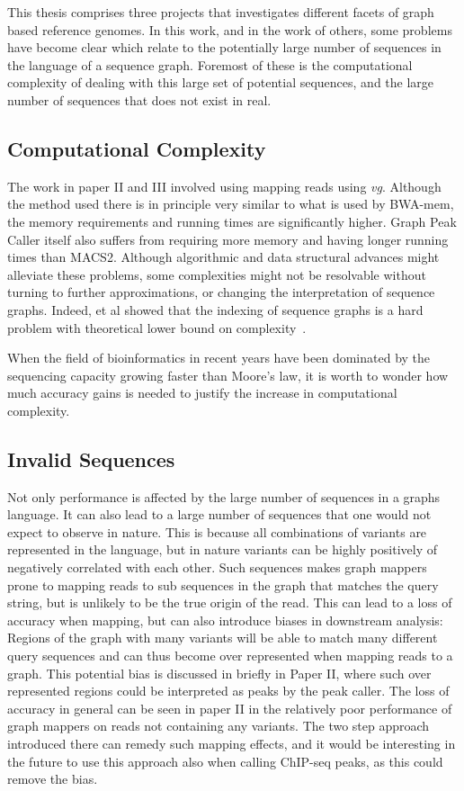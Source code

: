 This thesis comprises three projects that investigates different facets of graph based reference genomes.
In this work, and in the work of others, some problems have become clear which relate to the potentially large number of sequences in the language of a sequence graph. Foremost of these is the computational complexity of dealing with this large set of potential sequences, and the large number of sequences that does not exist in real.

\subsection{Computational Complexity}
The work in paper II and III involved using mapping reads using \emph{vg}.
Although the method used there is in principle very similar to what is used by BWA-mem, the memory requirements and running times are significantly higher.
Graph Peak Caller itself also suffers from requiring more memory and having longer running times than MACS2. 
Although algorithmic and data structural advances might alleviate these problems, some complexities might not be resolvable without turning to further approximations, or changing the interpretation of sequence graphs. Indeed,  et al showed that the indexing of sequence graphs is a hard problem with theoretical lower bound on complexity~\cite{indexcomplexity}.

When the field of bioinformatics in recent years have been dominated by the sequencing capacity growing faster than Moore's law, it is worth to wonder how much accuracy gains is needed to justify the increase in computational complexity.

\subsection{Invalid Sequences}
Not only performance is affected by the large number of sequences in a graphs language.
It can also lead to a large number of sequences that one would not expect to observe in nature.
This is because all combinations of variants are represented in the language, but in nature variants can be highly positively of negatively correlated with each other.
Such sequences makes graph mappers prone to mapping reads to sub sequences in the graph that matches the query string, but is unlikely to be the true origin of the read.
This can lead to a loss of accuracy when mapping, but can also introduce biases in downstream analysis: Regions of the graph with many variants will be able to match many different query sequences and can thus become over represented when mapping reads to a graph.
This potential bias is discussed in briefly in Paper II, where such over represented regions could be interpreted as peaks by the peak caller. The loss of accuracy in general can be seen in paper II in the relatively poor performance of graph mappers on reads not containing any variants. The two step approach introduced there can remedy such mapping effects, and it would be interesting in the future to use this approach also when calling ChIP-seq peaks, as this could remove the bias. 

